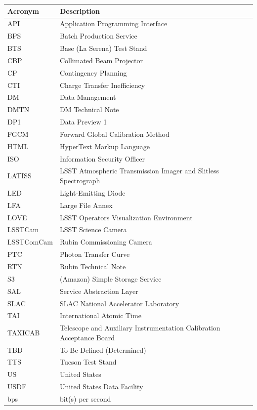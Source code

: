 \addtocounter{table}{-1}
\begin{longtable}{p{}p{}}\hline
\textbf{Acronym} & \textbf{Description}  \\\hline

API & Application Programming Interface \\\hline
BPS & Batch Production Service \\\hline
BTS & Base (La Serena) Test Stand \\\hline
CBP & Collimated Beam Projector \\\hline
CP & Contingency Planning \\\hline
CTI & Charge Transfer Inefficiency \\\hline
DM & Data Management \\\hline
DMTN & DM Technical Note \\\hline
DP1 & Data Preview 1 \\\hline
FGCM & Forward Global Calibration Method \\\hline
HTML & HyperText Markup Language \\\hline
ISO & Information Security Officer \\\hline
LATISS & LSST Atmospheric Transmission Imager and Slitless Spectrograph \\\hline
LED & Light-Emitting Diode \\\hline
LFA & Large File Annex \\\hline
LOVE & LSST Operators Visualization Environment \\\hline
LSSTCam & LSST Science Camera \\\hline
LSSTComCam & Rubin Commissioning Camera \\\hline
PTC & Photon Transfer Curve \\\hline
RTN & Rubin Technical Note \\\hline
S3 & (Amazon) Simple Storage Service \\\hline
SAL & Service Abstraction Layer \\\hline
SLAC & SLAC National Accelerator Laboratory \\\hline
TAI & International Atomic Time \\\hline
TAXICAB & Telescope and Auxiliary Instrumentation Calibration Acceptance Board \\\hline
TBD & To Be Defined (Determined) \\\hline
TTS & Tucson Test Stand \\\hline
US & United States \\\hline
USDF & United States Data Facility \\\hline
bps & bit(s) per second \\\hline
\end{longtable}
